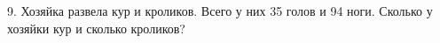 9. Хозяйка развела кур и кроликов. Всего у них 35 голов и 94 ноги. Сколько у хозяйки кур и сколько кроликов?\\
